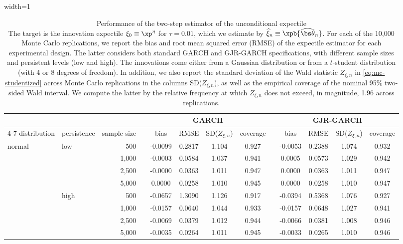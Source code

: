 \begin{table}[t]
\caption{Performance of the two-step estimator of the unconditional expectile\\ {\footnotesize The target is the innovation expectile $\xi_0\equiv\xp^\eta$ for $\tau=0.01$, which we estimate by $\widehat\xi_n\equiv\xpb{\widehat{\bs\theta}_n}$. For each of the 10,000 Monte Carlo replications, we report the bias and root mean squared error (RMSE) of the expectile estimator for each experimental design. The latter considers both standard GARCH and GJR-GARCH specifications, with different sample sizes and persistent levels (low and high). The innovations come either from a Gaussian distribution or from a $t$-student distribution (with 4 or 8 degrees of freedom). In addition, we also report the standard deviation of the Wald statistic $Z_{\xi,n}$ in \eqref{eq:mc-studentized} across Monte Carlo replications in the columns SD($Z_{\xi,n}$), as well as the empirical coverage of the nominal 95\% two-sided Wald interval. We compute the latter by the relative frequency at which $Z_{\xi,n}$ does not exceed, in magnitude, 1.96 across replications.}}
\label{tab:mc-xi-wald-portrait-tau-0p01}
\begin{adjustbox}{width=1\textwidth}
\renewcommand{\arraystretch}{1.25}
\begin{tabular}{llr*{9}{c}}
\toprule
&&&\multicolumn{4}{c}{GARCH}&&\multicolumn{4}{c}{GJR-GARCH}\\
\cline{4-7}\cline{9-12}
distribution & persistence & sample size~~ & bias & RMSE & SD($Z_{\xi,n}$) & coverage && bias & RMSE & SD($Z_{\xi,n}$) & coverage\\
\midrule
normal & low & 500~~ & -0.0099 & 0.2817 & 1.104 & 0.927 && -0.0053 & 0.2388 & 1.074 & 0.932\\
 &  & 1,000~~ & -0.0003 & 0.0584 & 1.037 & 0.941 && 0.0005 & 0.0573 & 1.029 & 0.942\\
 &  & 2,500~~ & -0.0000 & 0.0363 & 1.011 & 0.947 && 0.0000 & 0.0363 & 1.011 & 0.947\\
 &  & 5,000~~ & 0.0000 & 0.0258 & 1.010 & 0.945 && 0.0000 & 0.0258 & 1.010 & 0.947\\
\addlinespace[1pt]
 & high & 500~~ & -0.0657 & 1.3090 & 1.126 & 0.917 && -0.0394 & 0.5368 & 1.076 & 0.927\\
 &  & 1,000~~ & -0.0157 & 0.0640 & 1.044 & 0.933 && -0.0157 & 0.0648 & 1.027 & 0.941\\
 &  & 2,500~~ & -0.0069 & 0.0379 & 1.012 & 0.944 && -0.0066 & 0.0381 & 1.008 & 0.946\\
 &  & 5,000~~ & -0.0035 & 0.0264 & 1.011 & 0.945 && -0.0033 & 0.0265 & 1.010 & 0.946\\

\end{tabular}
\end{adjustbox}
\end{table}
